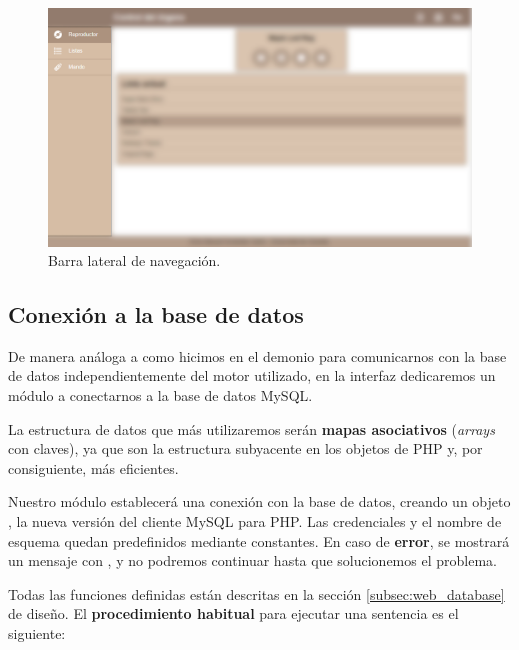 \smallskip

\begin{figure}[H]
	\noindent \begin{centering}
		\includegraphics[width=\linewidth*3/4]{capitulo5/cap_navigation}
		\par\end{centering}
	\smallskip
	\caption{\label{fig:cap_navigation} Barra lateral de navegación.}
\end{figure} 

\smallskip

\subsection{Conexión a la base de datos}

De manera análoga a como hicimos en el demonio para comunicarnos con la base de datos independientemente del motor utilizado, en la interfaz dedicaremos un módulo a conectarnos a la base de datos MySQL.

La estructura de datos que más utilizaremos serán \textbf{mapas asociativos} (\textit{arrays} con claves), ya que son la estructura subyacente en los objetos de \acrshort{PHP} y, por consiguiente, más eficientes.

Nuestro módulo establecerá una conexión con la base de datos, creando un objeto , la nueva versión del cliente MySQL para \acrshort{PHP}. Las credenciales y el nombre de esquema quedan predefinidos mediante constantes. En caso de \textbf{error}, se mostrará un mensaje con , y no podremos continuar hasta que solucionemos el problema.

Todas las funciones definidas están descritas en la sección \ref{subsec:web_database} de diseño. El \textbf{procedimiento habitual} para ejecutar una sentencia es el siguiente:

